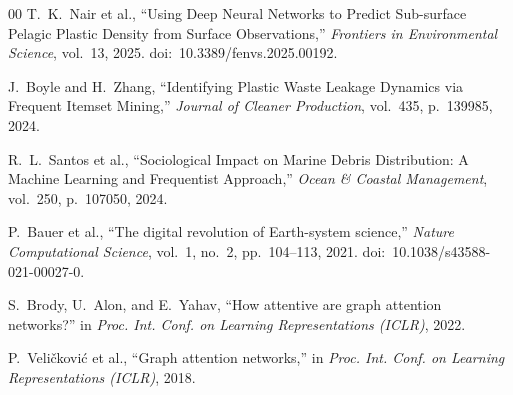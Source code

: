 \documentclass[conference]{IEEEtran}
\begin{document}
\begin{thebibliography}{00}
T.~K.~Nair et al., ``Using Deep Neural Networks to Predict Sub-surface Pelagic Plastic Density from Surface Observations,'' \textit{Frontiers in Environmental Science}, vol.~13, 2025. doi:~10.3389/fenvs.2025.00192.

J.~Boyle and H.~Zhang, ``Identifying Plastic Waste Leakage Dynamics via Frequent Itemset Mining,'' \textit{Journal of Cleaner Production}, vol.~435, p.~139985, 2024.

R.~L.~Santos et al., ``Sociological Impact on Marine Debris Distribution: A Machine Learning and Frequentist Approach,'' \textit{Ocean \& Coastal Management}, vol.~250, p.~107050, 2024.

P.~Bauer et al., ``The digital revolution of Earth-system science,'' \textit{Nature Computational Science}, vol.~1, no.~2, pp.~104--113, 2021. doi:~10.1038/s43588-021-00027-0.

S.~Brody, U.~Alon, and E.~Yahav, ``How attentive are graph attention networks?'' in \textit{Proc. Int. Conf. on Learning Representations (ICLR)}, 2022.

P.~Veli\v{c}kovi\'{c} et al., ``Graph attention networks,'' in \textit{Proc. Int. Conf. on Learning Representations (ICLR)}, 2018.

\end{thebibliography}
\end{document}
